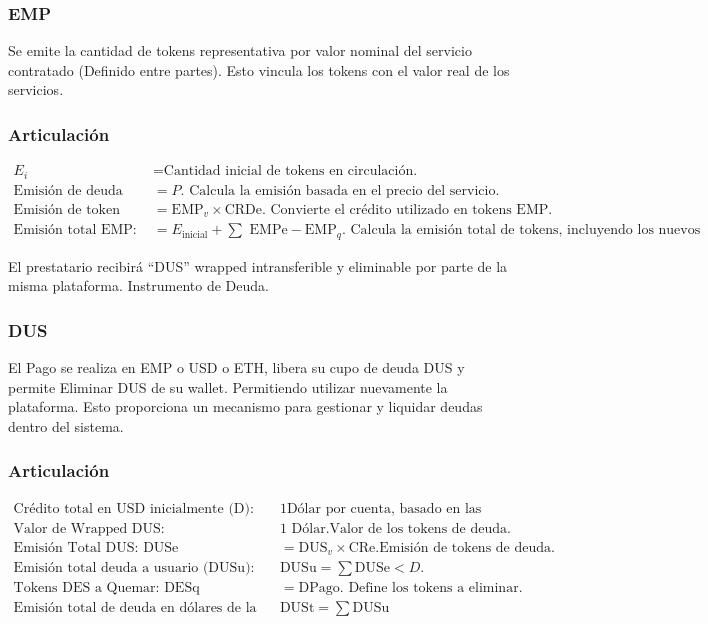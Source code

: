 \documentclass{article}
\begin{document}
\subsubsection*{EMP}
Se emite la cantidad de tokens representativa por valor nominal del servicio contratado (Definido entre partes). Esto vincula los tokens con el valor real de los servicios.

\subsubsection*{Articulación}
\begin{align*}
    E_i & = \text{Cantidad inicial de tokens en circulación.} \\
    \text{Emisión de deuda ejecutada por Crédito Utilizado: CRDe} & = P. \text{ Calcula la emisión basada en el precio del servicio.} \\
    \text{Emisión de token EMP: EMPe} & = \text{EMP}_v \times \text{CRDe}. \text{ Convierte el crédito utilizado en tokens EMP.} \\
    \text{Emisión total EMP: EMPet} & = E_{\text{inicial}} + \sum \text{ EMPe} - \text{EMP}_q. \text{ Calcula la emisión total de tokens, incluyendo los nuevos y los quemados.}
\end{align*}

El prestatario recibirá “DUS” wrapped intransferible y eliminable por parte de la misma plataforma. Instrumento de Deuda.

\subsubsection*{DUS}
El Pago se realiza en EMP o USD o ETH, libera su cupo de deuda DUS y permite Eliminar DUS de su wallet. Permitiendo utilizar nuevamente la plataforma. Esto proporciona un mecanismo para gestionar y liquidar deudas dentro del sistema.

\subsubsection*{Articulación}
\begin{align*}  
    \text {Crédito total en USD inicialmente (D):} & 1 \text{Dólar por cuenta, basado en las reservas.} \\
    \text{Valor de Wrapped DUS:} & 1 \text{ Dólar}. \text{Valor de los tokens de deuda.} \\
    \text{Emisión Total DUS: DUSe} & = \text{DUS}_v \times \text{CRe}. \text{Emisión de tokens de deuda.} \\
    \text{Emisión total deuda a usuario (DUSu):} & \text{DUSu} = \sum \text{DUSe} < D. \\
    \text{Tokens DES a Quemar: DESq} & = \text{DPago}. \text{ Define los tokens a eliminar.} \\
    \text{Emisión total de deuda en dólares de la plataforma (DUSt):} & \text{DUSt} = \sum \text{DUSu} 
\end{align*}
\end{document}
